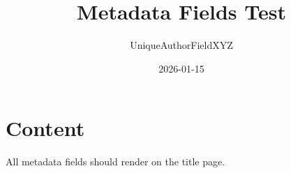 \documentclass[titlepage=simple]{SUSTechHomework}
\title{Metadata Fields Test}
\author{UniqueAuthorFieldXYZ}
\date{2026-01-15}
\begin{document}
\maketitle
\section{Content}
All metadata fields should render on the title page.
\end{document}
